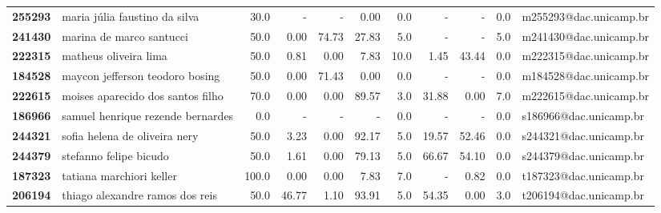 \documentclass[11pt]{article}
\begin{document}
\begin{center}
\begin{landscape}
\begin{longtable}{llrrrrrrrrl}
\textbf{255293} &         maria júlia faustino da silva &                  30.0 &           - &           - &        0.00 &                      0.0 &           - &           - &                        0.0 &  m255293@dac.unicamp.br \\
\textbf{241430} &              marina de marco santucci &                  50.0 &        0.00 &       74.73 &       27.83 &                      5.0 &           - &           - &                        5.0 &  m241430@dac.unicamp.br \\
\textbf{222315} &                 matheus oliveira lima &                  50.0 &        0.81 &        0.00 &        7.83 &                     10.0 &        1.45 &       43.44 &                        0.0 &  m222315@dac.unicamp.br \\
\textbf{184528} &       maycon jefferson teodoro bosing &                  50.0 &        0.00 &       71.43 &        0.00 &                      0.0 &           - &           - &                        0.0 &  m184528@dac.unicamp.br \\
\textbf{222615} &     moises aparecido dos santos filho &                  70.0 &        0.00 &        0.00 &       89.57 &                      3.0 &       31.88 &        0.00 &                        7.0 &  m222615@dac.unicamp.br \\
\textbf{186966} &     samuel henrique rezende bernardes &                   0.0 &           - &           - &           - &                      0.0 &           - &           - &                        0.0 &  s186966@dac.unicamp.br \\
\textbf{244321} &         sofia helena de oliveira nery &                  50.0 &        3.23 &        0.00 &       92.17 &                      5.0 &       19.57 &       52.46 &                        0.0 &  s244321@dac.unicamp.br \\
\textbf{244379} &                stefanno felipe bicudo &                  50.0 &        1.61 &        0.00 &       79.13 &                      5.0 &       66.67 &       54.10 &                        0.0 &  s244379@dac.unicamp.br \\
\textbf{187323} &              tatiana marchiori keller &                 100.0 &        0.00 &        0.00 &        7.83 &                      7.0 &           - &        0.82 &                        0.0 &  t187323@dac.unicamp.br \\
\textbf{206194} &       thiago alexandre ramos dos reis &                  50.0 &       46.77 &        1.10 &       93.91 &                      5.0 &       54.35 &        0.00 &                        3.0 &  t206194@dac.unicamp.br \\

\end{longtable}
\end{landscape}
\end{center}
\end{document}
